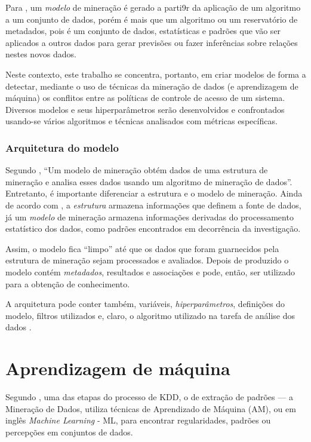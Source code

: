 Para , um \textit{modelo} de mineração é gerado a parti9r da aplicação de um algoritmo a um conjunto de dados, porém é mais que um algoritmo ou um reservatório de metadados, pois é um conjunto de dados, estatísticas e padrões que vão ser aplicados a outros dados para gerar previsões ou fazer inferências sobre relações nestes novos dados.

Neste contexto, este trabalho se concentra, portanto, em criar modelos de forma a detectar, mediante o uso de técnicas da mineração de dados (e aprendizagem de máquina) os conflitos entre as políticas de controle de acesso de um sistema. Diversos modelos e seus hiperparâmetros serão desenvolvidos e confrontados usando-se vários algoritmos e técnicas analisados com métricas específicas.

\subsubsection{Arquitetura do modelo}\label{arquitetura_modelo}

Segundo , ``Um modelo de mineração obtém dados de uma estrutura de mineração e analisa esses dados usando um algoritmo de mineração de dados''. Entretanto, é importante diferenciar a estrutura e o modelo de mineração. Ainda de acordo com , a \textit{estrutura} armazena informações que definem a fonte de dados, já um \textit{modelo} de mineração armazena informações derivadas do processamento estatístico dos dados, como padrões encontrados em decorrência da investigação.

Assim, o modelo fica ``limpo'' até que os dados que foram guarnecidos pela estrutura de mineração sejam processados e avaliados. Depois de produzido o modelo contém \textit{metadados}, resultados e associações e pode, então, ser utilizado para a obtenção de conhecimento.

A arquitetura pode conter também, variáveis, \textit{hiperparâmetros}, definições do modelo, filtros utilizados e, claro, o algoritmo utilizado na tarefa de análise dos dados \cite{deep_learning_book_2019}.

\section{Aprendizagem de máquina} \label{aprendizagem_maquina}
Segundo , uma das etapas do processo de KDD, o de extração de padrões --- a Mineração de Dados, utiliza técnicas de Aprendizado de Máquina (AM), ou em inglês \textit{Machine Learning} - ML, para encontrar regularidades, padrões ou percepções  em conjuntos de dados.

